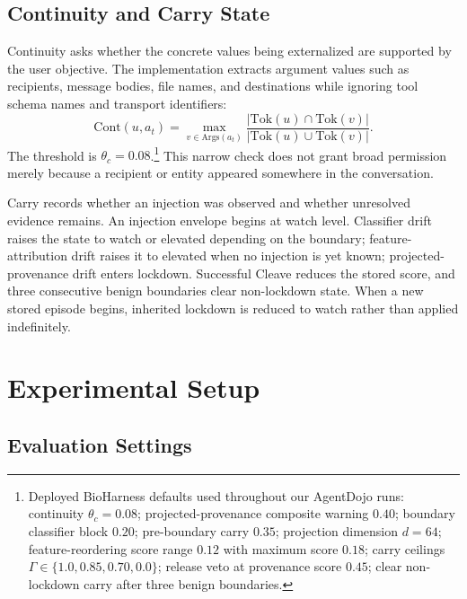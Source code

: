 \subsection{Continuity and Carry State}
\label{sec:continuity}

Continuity asks whether the concrete values being externalized are supported by the user objective. The implementation extracts argument values such as recipients, message bodies, file names, and destinations while ignoring tool schema names and transport identifiers:
\begin{equation}
\mathrm{Cont}(u,a_t)
=
\max_{v\in\mathrm{Args}(a_t)}
\frac{|\mathrm{Tok}(u)\cap\mathrm{Tok}(v)|}
     {|\mathrm{Tok}(u)\cup\mathrm{Tok}(v)|}.
\end{equation}
The threshold is $\theta_c=0.08$.\footnote{Deployed BioHarness defaults used throughout our AgentDojo runs: continuity $\theta_c{=}0.08$; projected-provenance composite warning $0.40$; boundary classifier block $0.20$; pre-boundary carry $0.35$; projection dimension $d{=}64$; feature-reordering score range $0.12$ with maximum score $0.18$; carry ceilings $\Gamma{\in}\{1.0,0.85,0.70,0.0\}$; release veto at provenance score $0.45$; clear non-lockdown carry after three benign boundaries.} This narrow check does not grant broad permission merely because a recipient or entity appeared somewhere in the conversation.

Carry records whether an injection was observed and whether unresolved evidence remains. An injection envelope begins at watch level. Classifier drift raises the state to watch or elevated depending on the boundary; feature-attribution drift raises it to elevated when no injection is yet known; projected-provenance drift enters lockdown. Successful Cleave reduces the stored score, and three consecutive benign boundaries clear non-lockdown state. When a new stored episode begins, inherited lockdown is reduced to watch rather than applied indefinitely.

\section{Experimental Setup}

\subsection{Evaluation Settings}


